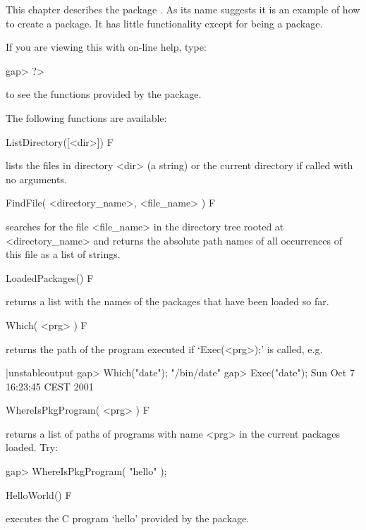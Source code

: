 

This chapter  describes  the  {\GAP}  package  {\Example}.  As  its  name
suggests it is an example of how to  create  a  {\GAP}  package.  It  has
little functionality except for being a package.

If you are viewing this with on-line help, type: 

\beginexample
gap> ?>
\endexample

to see the functions provided by the {\Example} package.


The following functions are available:

\>ListDirectory([<dir>]) F

lists the files in directory <dir> (a string) or the current directory if
called with no arguments.

\>FindFile( <directory_name>, <file_name> ) F

searches  for the  file   <file_name> in  the  directory  tree  rooted at
<directory_name> and returns the absolute path names of  all  occurrences
of this file as a list of strings.

\>LoadedPackages() F

returns a list with the names of the packages that have  been  loaded  so
far.

\>Which( <prg> ) F

returns the path of the program executed if `Exec(<prg>);' is called, e.g.

\beginexample|unstableoutput
gap> Which("date");         
"/bin/date"
gap> Exec("date");
Sun Oct  7 16:23:45 CEST 2001
\endexample

\>WhereIsPkgProgram( <prg> ) F

returns a list of paths of  programs  with  name  <prg>  in  the  current
packages loaded. Try:

\beginexample
gap> WhereIsPkgProgram( "hello" );
\endexample

\>HelloWorld() F

executes the C program `hello' provided by the {\Example} package.



